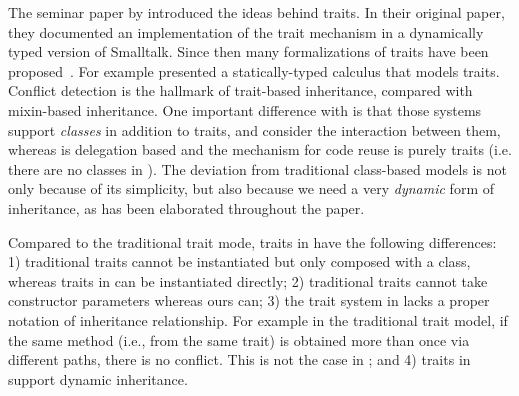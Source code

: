 The seminar paper by \citet{scharli2003traits} introduced the ideas behind
traits. In their original paper, they documented an implementation of the trait
mechanism in a dynamically typed version of Smalltalk. Since then many
formalizations of traits have been
proposed~\cite{scharli2003traitsformal,ducasse2006traits,bettini2010prototypical}.
For example \citet{fisher2004typed} presented a statically-typed calculus that
models traits. Conflict detection is the hallmark of trait-based
inheritance, compared with mixin-based inheritance. One important difference
with \name is that those systems support \textit{classes} in addition to traits,
and consider the interaction between them, whereas \name is 
delegation based and the mechanism for code reuse is purely traits
(i.e. there are no classes in \name). The
deviation from traditional class-based models is not only because of its
simplicity, but also because we need a very \textit{dynamic} form of
inheritance, as has been elaborated throughout the paper.

Compared to the traditional trait mode, traits in \name have the following
differences: 1) traditional traits cannot be instantiated but only composed with
a class, whereas traits in \name can be instantiated directly; 2) traditional
traits cannot take constructor parameters whereas ours can; 3) the trait system
in \name lacks a proper notation of inheritance relationship. For example in the
traditional trait model, if the same method (i.e., from the same trait) is
obtained more than once via different paths, there is no conflict. This is not
the case in \name; and 4) traits in \name support dynamic
inheritance. 






